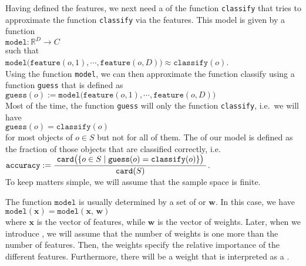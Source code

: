 Having defined the features, we next need a  of the function \texttt{classify} that tries to approximate the
function \texttt{classify} via the features.  This model is given by a function
\\[0.2cm]
\hspace*{1.3cm}
$\mathtt{model}: \mathbb{R}^D \rightarrow C$
\\[0.2cm]
such that
\\[0.2cm]
\hspace*{1.3cm}
$\mathtt{model}\bigl(\mathtt{feature}(o,1), \cdots, \mathtt{feature}(o,D)\bigr) \approx \mathtt{classify}(o)$.
\\[0.2cm]
Using the function \texttt{model}, we can then approximate the function classify using a function \texttt{guess} that is
defined as
\\[0.2cm]
\hspace*{1.3cm}
$\mathtt{guess}(o) := \mathtt{model}\bigl(\mathtt{feature}(o,1), \cdots, \mathtt{feature}(o,D)\bigr)$
\\[0.2cm]
Most of the time, the function \texttt{guess} will only  the function \texttt{classify}, i.e.~we will have
\\[0.2cm]
\hspace*{1.3cm}
$\mathtt{guess}(o) = \mathtt{classify}(o)$
\\[0.2cm]
for most objects of $o \in S$ but not for all of them.  The   of our model is
defined as the fraction of those objects that are classified correctly, i.e.~
\\[0.2cm]
\hspace*{1.3cm}
$\displaystyle \mathtt{accuracy} := \frac{\;\mathtt{card}\bigl( \{ o \in S \mid \mathtt{guess}(o) = \mathtt{classify}(o)\}\bigr)\;}{\mathtt{card}(S)}$.
\\[0.2cm]
To keep matters simple, we will assume that the sample space is finite.

The function $\mathtt{model}$ is usually determined by a set of  or  $\mathbf{w}$. In
this case, we have
\\[0.2cm]
\hspace*{1.3cm}
$\mathtt{model}(\mathbf{x}) = \mathtt{model}(\mathbf{x},\,\mathbf{w})$
\\[0.2cm]
where $\mathbf{x}$ is the vector of features, while $\mathbf{w}$ is the vector of weights.  Later, when we
introduce , we will assume that the number of weights is one more than the number of
features.  Then, the weights specify the relative importance of the different features. Furthermore, there will
be a weight that is interpreted as a . 

